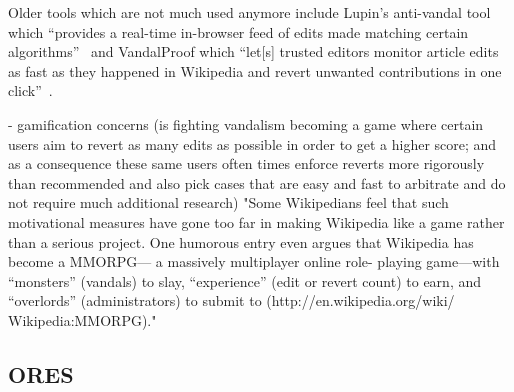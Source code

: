 
Older tools which are not much used anymore include Lupin's anti-vandal tool which
``provides a real-time in-browser feed of edits made matching certain algorithms''~\cite{GeiRib2010}
and VandalProof which
``let[s] trusted editors monitor article edits as fast as they happened in Wikipedia and revert unwanted contributions in one click''~\cite{HalRied2012}.


- gamification concerns (is fighting vandalism becoming a game where certain users aim to revert as many edits as possible in order to get a higher score; and as a consequence these same users often times enforce reverts more rigorously than recommended and also pick cases that are easy and fast to arbitrate and do not require much additional research)
    \cite{HalRied2012}
    "Some Wikipedians feel that such
    motivational measures have gone
    too far in making Wikipedia like a
    game rather than a serious project.
    One humorous entry even argues that
    Wikipedia has become a MMORPG—
    a massively multiplayer online role-
    playing game—with “monsters”
    (vandals) to slay, “experience”
    (edit or revert count) to earn, and
    “overlords” (administrators) to submit
    to (http://en.wikipedia.org/wiki/
    Wikipedia:MMORPG)."

\subsection{ORES}

